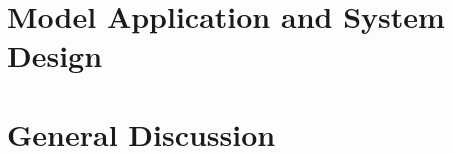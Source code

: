 \documentclass{yorkThesis}
\begin{document}
\chapter{Model Application and System Design}
\label{chapter_appliction}


\chapter{General Discussion}
\label{chapter_general_discussion}





\appendix




\end{document}
